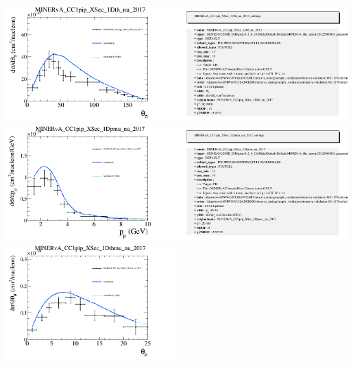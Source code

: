 \documentclass{article}
\begin{document}
\centering
\includegraphics[width=0.49\textwidth]{figures/nuisance_MINERvA_CC1pip_XSec_1Dth_nu_2017_comp.png}
\includegraphics[width=0.49\textwidth]{figures/nuisance_MINERvA_CC1pip_XSec_1Dth_nu_2017_info.png}
\centering
\includegraphics[width=0.49\textwidth]{figures/nuisance_MINERvA_CC1pip_XSec_1Dpmu_nu_2017_comp.png}
\includegraphics[width=0.49\textwidth]{figures/nuisance_MINERvA_CC1pip_XSec_1Dpmu_nu_2017_info.png}
\centering
\includegraphics[width=0.49\textwidth]{figures/nuisance_MINERvA_CC1pip_XSec_1Dthmu_nu_2017_comp.png}
\end{document}
